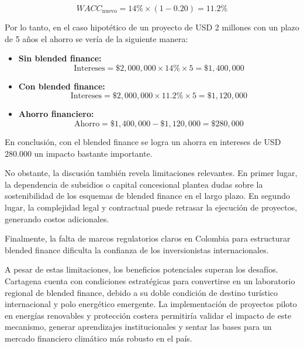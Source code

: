 \begin{equation*}
    WACC_{\text{nuevo}} = 14\% \times (1 - 0.20) = 11.2\%
\end{equation*}

Por lo tanto, en el caso hipotético de un proyecto de USD 2 millones con un plazo de 5 años el ahorro se vería de la siguiente manera:

\begin{itemize}
    \item \textbf{Sin blended finance:}
    \[
        \text{Intereses} = \$2{,}000{,}000 \times 14\% \times 5 = \$1{,}400{,}000
    \]
    \item \textbf{Con blended finance:}
    \[
        \text{Intereses} = \$2{,}000{,}000 \times 11.2\% \times 5 = \$1{,}120{,}000
    \]
    \item \textbf{Ahorro financiero:}
    \[
        \text{Ahorro} = \$1{,}400{,}000 - \$1{,}120{,}000 = \$280{,}000
    \]
\end{itemize}

En conclusión, con el blended finance se logra un ahorra en intereses de USD $280.000$ un impacto bastante importante.

No obstante, la discusión también revela limitaciones relevantes. En primer lugar, la dependencia de subsidios o capital concesional plantea dudas sobre la sostenibilidad de los esquemas de blended finance en el largo plazo. En segundo lugar, la complejidad legal y contractual puede retrasar la ejecución de proyectos, generando costos adicionales. 

Finalmente, la falta de marcos regulatorios claros en Colombia para estructurar blended finance dificulta la confianza de los inversionistas internacionales.

A pesar de estas limitaciones, los beneficios potenciales superan los desafíos. Cartagena cuenta con condiciones estratégicas para convertirse en un laboratorio regional de blended finance, debido a su doble condición de destino turístico internacional y polo energético emergente. La implementación de proyectos piloto en energías renovables y protección costera permitiría validar el impacto de este mecanismo, generar aprendizajes institucionales y sentar las bases para un mercado financiero climático más robusto en el país.